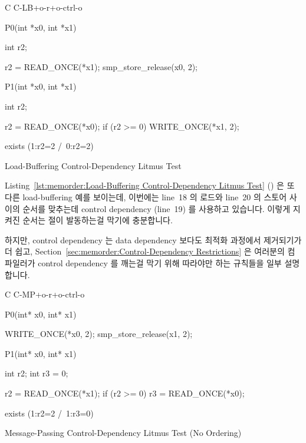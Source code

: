 \begin{listing}[tbp]
{ \scriptsize
\begin{verbbox}[\LstLineNo]
C C-LB+o-r+o-ctrl-o
{
}

P0(int *x0, int *x1)
{
  int r2;

  r2 = READ_ONCE(*x1);
  smp_store_release(x0, 2);
}


P1(int *x0, int *x1)
{
  int r2;

  r2 = READ_ONCE(*x0);
  if (r2 >= 0)
    WRITE_ONCE(*x1, 2);
}

exists (1:r2=2 /\ 0:r2=2)
\end{verbbox}
}
\centering
\theverbbox
\caption{Load-Buffering Control-Dependency Litmus Test}
\label{lst:memorder:Load-Buffering Control-Dependency Litmus Test}
\end{listing}

Listing~\ref{lst:memorder:Load-Buffering Control-Dependency Litmus Test}
()
은 또다른 load-buffering 예를 보이는데, 이번에는 line~18 의 로드와 line~20 의
스토어 사이의 순서를 맞추는데 control dependency (line~19) 를 사용하고
있습니다.
이렇게 지켜진 순서는  절이 발동하는걸 막기에 충분합니다.

하지만, control dependency 는 data dependency 보다도 최적화 과정에서 제거되기가 더 쉽고,
Section~\ref{sec:memorder:Control-Dependency Restrictions}
은 여러분의 컴파일러가 control dependency 를 깨는걸 막기 위해 따라야만 하는
규칙들을 일부 설명합니다.

\begin{listing}[tbp]
{ \scriptsize
\begin{verbbox}[\LstLineNo]
C C-MP+o-r+o-ctrl-o

{
}

P0(int* x0, int* x1) {

  WRITE_ONCE(*x0, 2);
  smp_store_release(x1, 2);

}

P1(int* x0, int* x1) {
  int r2;
  int r3 = 0;

  r2 = READ_ONCE(*x1);
  if (r2 >= 0)
    r3 = READ_ONCE(*x0);

}

exists (1:r2=2 /\ 1:r3=0)
\end{verbbox}
}
\centering
\theverbbox
\caption{Message-Passing Control-Dependency Litmus Test (No Ordering)}
\label{lst:memorder:Message-Passing Control-Dependency Litmus Test (No Ordering)}
\end{listing}

